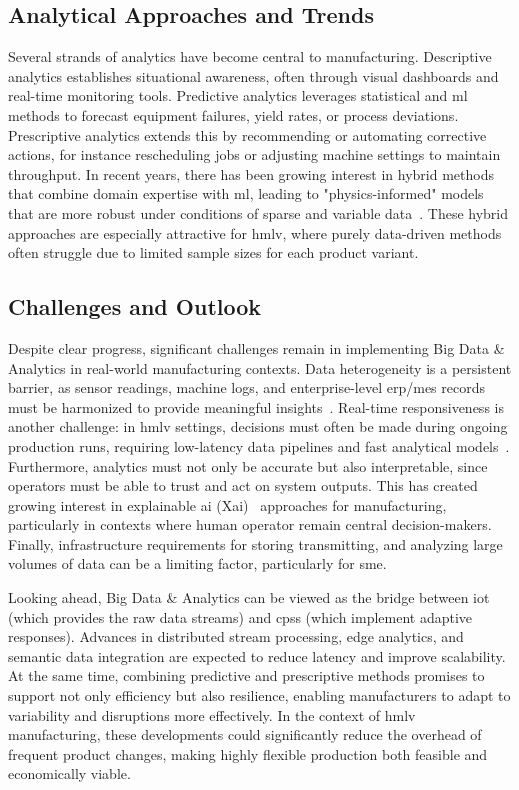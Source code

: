 \subsection{Analytical Approaches and Trends}

Several strands of analytics have become central to manufacturing.
Descriptive analytics establishes situational awareness, often through visual dashboards and real-time monitoring tools.
Predictive analytics leverages statistical and \ac{ml} methods to forecast equipment failures, yield rates, or process deviations.
Prescriptive analytics extends this by recommending or automating corrective actions, for instance rescheduling jobs or adjusting machine settings to maintain throughput.
In recent years, there has been growing interest in hybrid methods that combine domain expertise with \ac{ml}, leading to "physics-informed" models that are more robust under conditions of sparse and variable data~\cite{lu-indsutry-40-a-survey-on-technologies}.
These hybrid approaches are especially attractive for \ac{hmlv}, where purely data-driven methods often struggle due to limited sample sizes for each product variant.

\subsection{Challenges and Outlook}

Despite clear progress, significant challenges remain in implementing Big Data \& Analytics in real-world manufacturing contexts.
Data heterogeneity is a persistent barrier, as sensor readings, machine logs, and enterprise-level \ac{erp}/\ac{mes} records must be harmonized to provide meaningful insights~\cite{zhong-intelligent-manufacturing-in-the-context}.
Real-time responsiveness is another challenge: in \ac{hmlv} settings, decisions must often be made during ongoing production runs, requiring low-latency data pipelines and fast analytical models~\cite{al-fuqaha-internet-of-things-a-survey-on-enabling}.
Furthermore, analytics must not only be accurate but also interpretable, since operators must be able to trust and act on system outputs.
This has created growing interest in explainable \ac{ai} (X\ac{ai})~\cite{alexander-an-interrogative-survey-of-explainable-ai-in-manufacturing} approaches for manufacturing, particularly in contexts where human operator remain central decision-makers.
Finally, infrastructure requirements for storing transmitting, and analyzing large volumes of data can be a limiting factor, particularly for \ac{sme}.

Looking ahead, Big Data \& Analytics can be viewed as the bridge between \ac{iot} (which provides the raw data streams) and \ac{cps}s (which implement adaptive responses).
Advances in distributed stream processing, edge analytics, and semantic data integration are expected to reduce latency and improve scalability.
At the same time, combining predictive and prescriptive methods promises to support not only efficiency but also resilience, enabling manufacturers to adapt to variability and disruptions more effectively.
In the context of \ac{hmlv} manufacturing, these developments could significantly reduce the overhead of frequent product changes, making highly flexible production both feasible and economically viable.
